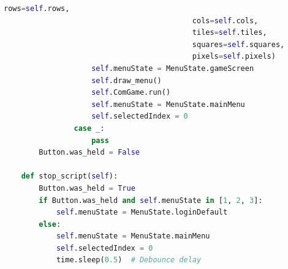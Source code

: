 \begin{scriptsize}
\begin{lstlisting}[style=Python, language=Python, captionpos=b, stepnumber=5, caption = {oopmenu.py}, label={lst:oopmenu}]
                                           rows=self.rows,
                                           cols=self.cols,
                                           tiles=self.tiles,
                                           squares=self.squares,
                                           pixels=self.pixels)
                    self.menuState = MenuState.gameScreen
                    self.draw_menu()
                    self.ComGame.run()
                    self.menuState = MenuState.mainMenu
                    self.selectedIndex = 0
                case _:
                    pass
        Button.was_held = False

    def stop_script(self):
        Button.was_held = True
        if Button.was_held and self.menuState in [1, 2, 3]:
            self.menuState = MenuState.loginDefault
        else:
            self.menuState = MenuState.mainMenu
            self.selectedIndex = 0
            time.sleep(0.5)  # Debounce delay


\end{lstlisting}
\end{scriptsize}
